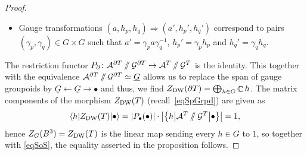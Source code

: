 \documentclass[pdftex]{sigma}
\DeclareMathOperator{\C}{\mathbb{C}}
\newcommand{\sslash}{\mathbin{/\mkern-6mu/}}
\numberwithin{equation}{section}
\theoremstyle{definition}
\begin{document}
\begin{proof}
\begin{itemize}
 \item Gauge transformations $(a, h_p, h_q) \Rightarrow (a', h_p', h_q')$ correspond to pairs $(\gamma_p, \gamma_q) \in G \times G$ such that $a' = \gamma_pa\gamma_q^{-1}$, $h_p' = \gamma_ph_p$ and $h_q' = \gamma_q h_q$.
 \end{itemize}
 The restriction functor $P_{\partial}\colon \mathcal{A}^{\partial T} \sslash \mathcal{G}^{\partial T} \rightarrow \mathcal{A}^{ T} \sslash \mathcal{G}^{ T}$ is the identity. This together with the equivalence $\mathcal{A}^{\partial T} \sslash \mathcal{G}^{\partial T} \simeq \underline{G} $ allows us to replace the span of gauge groupoids by $\underline{G} \leftarrow \underline{G} \rightarrow \bullet$ and thus, we find $Z_{\rm DW}(\partial T) = \bigoplus_{h \in G} \C h$. The matrix components of the morphism $Z_{\rm DW}(T)$ (recall~\eqref{eqSpGrpd}) are given as
 \begin{align*}
 \langle h | Z_{\rm DW}(T) | \bullet \rangle = |P_{\bullet}(\bullet)| \cdot \bigl|\bigl\{h \big| \mathcal{A}^{ T} \sslash \mathcal{G}^{ T} \big| \bullet\bigr\} \bigr| = 1,
 \end{align*}
 hence $Z_G(B^3) = Z_{\rm DW}(T)$ is the linear map sending every $h \in G$ to $1$, so together with \eqref{eqSoS}, the equality asserted in the proposition follows.
\end{proof}
\end{document}
